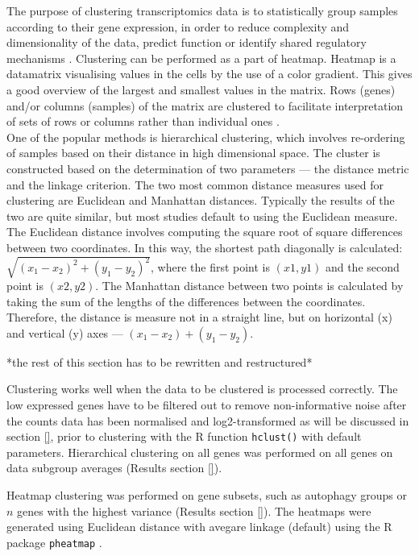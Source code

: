     The purpose of clustering transcriptomics data is to statistically group samples according to their gene expression, in order to reduce complexity and dimensionality of the data, predict function or identify shared regulatory mechanisms \cite{Metsalu2015ClustVis:Heatmap}. Clustering can be performed as a part of heatmap. Heatmap is a datamatrix visualising values in the cells by the use of a color gradient. This gives a good overview of the largest and smallest values in the matrix. Rows (genes) and/or columns (samples) of the matrix are clustered to facilitate interpretation of sets of rows or columns rather than individual ones \cite{Metsalu2015ClustVis:Heatmap}.\\

    One of the popular methods is hierarchical clustering, which involves re-ordering of samples based on their distance in high dimensional space. The cluster is constructed based on the determination of two parameters — the distance metric and the linkage criterion.
    The two most common distance measures used for clustering are Euclidean and Manhattan distances. Typically the results of the two are quite similar, but most studies default to using the Euclidean measure. 
    The Euclidean distance involves computing the square root of square differences between two coordinates. In this way, the shortest path diagonally is calculated: $ \sqrt{(x_{1}-x_{2})^{2}+(y_{1}-y_{2})^{2}}$, where the first point is $(x1, y1)$ and the second point is $(x2, y2).$
    The Manhattan distance between two points is calculated by taking the sum of the lengths of the differences between the coordinates. Therefore, the distance is measure not in a straight line, but on horizontal (x) and vertical (y) axes — $ (x_{1}-x_{2})+(y_{1}-y_{2}).$
    
    *the rest of this section has to be rewritten and restructured*
    
    Clustering works well when the data to be clustered is processed correctly. The low expressed genes have to be filtered out to remove non-informative noise after the counts data has been normalised and log2-transformed as will be discussed in section \ref{}, prior to clustering with the R function \texttt{hclust()} with default parameters. Hierarchical clustering on all genes was performed on all genes on data subgroup averages (Results section \ref{}).
    
    Heatmap clustering was performed on gene subsets, such as autophagy groups or $n$ genes with the highest variance (Results section \ref{}). The heatmaps were generated using Euclidean distance with avegare linkage (default) using the R package  \texttt{pheatmap} \cite{kolde2012pheatmap}.\\
    
